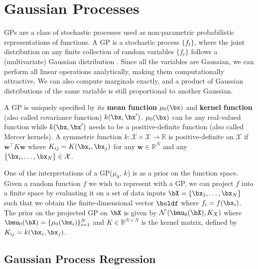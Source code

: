 \section{Gaussian Processes}
\label{sec:gps}

\acfp{GP} are a class of stochastic processes used as non-parametric probabilistic representations of functions.
A \ac{GP} is a stochastic process $\{f_t\}$, where the joint distribution on any finite collection of random variables $\{f_t\}$ follows a (multivariate) Gaussian distribution \cite{rasmussen2006gaussian}.
Since all the variables are Gaussian, we can perform all linear operations analytically, making them computationally attractive.
We can also compute marginals exactly, and a product of Gaussian distributions of the same variable is still proportional to another Gaussian.

A \ac{GP} is uniquely specified by its \textbf{mean function} $\mu_0(\bx)$ and \textbf{kernel function} (also called covariance function) $k(\bx, \bx')$.
$\mu_0(\bx)$ can be any real-valued function while $k(\bx, \bx')$ needs to be a positive-definite function (also called Mercer kernels).
A symmetric function $k:\mathcal{X}\times\mathcal{X}\rightarrow \mathbb{R} $ is positive-definite on $\mathcal{X}$ if $\boldsymbol{w}^\top K \boldsymbol{w}$ where $K_{ij} = K(\bx_i,\bx_j)$ for any $\boldsymbol{w}\in\mathbb{R}^N$ and any $\{\bx_i,\ldots,\bx_N\} \in \mathcal{X}$.

One of the interpretations of a \ac{GP}($\mu_0$, $k$) is as a prior on the function space.
Given a random function $f$ we wish to represent with a \ac{GP}, we can project $f$ into a finite space by evaluating it on a set of data inputs $\bX = \{\bx_1, \ldots, \bx_N\}$ such that we obtain the finite-dimensional vector $\boldf$ where $f_i = f(\bx_i)$.
The prior on the projected \ac{GP} on $\bX$ is given by $\mathcal{N}\left(\bmu_0(\bX), K_{X}\right)$ where $\bmu_0(\bX) = \{\mu_0(\bx_i)\}_{i=1}^N$ and $K \in \mathbb{R}^{N\times N}$ is the kernel matrix, defined by $K_{ij} = k(\bx_i, \bx_j)$.

\subsection{Gaussian Process Regression}

